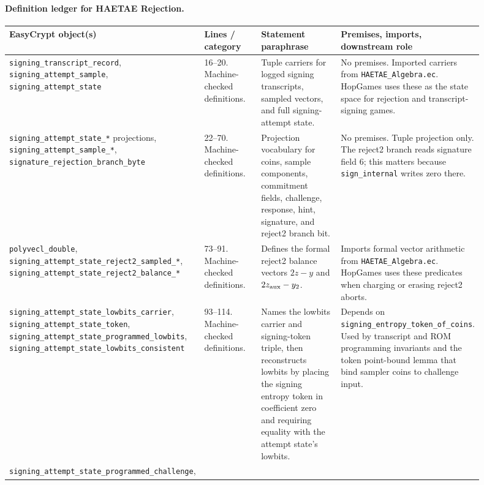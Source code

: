 \documentclass[11pt]{report}
\DeclareRobustCommand{\file}[1]{\ifmmode\text{\nolinkurl{#1}}\else\nolinkurl{#1}\fi}
\DeclareRobustCommand{\ec}[1]{\ifmmode\text{\nolinkurl{#1}}\else\nolinkurl{#1}\fi}
\theoremstyle{definition}
\theoremstyle{plain}
\begin{document}
\paragraph{Definition ledger for HAETAE Rejection.}
{\footnotesize
\begin{longtable}{p{0.24\linewidth}p{0.15\linewidth}p{0.27\linewidth}p{0.24\linewidth}}
\toprule
\textbf{EasyCrypt object(s)} & \textbf{Lines / category} &
\textbf{Statement paraphrase} & \textbf{Premises, imports, downstream role} \\
\midrule
\ec{signing\_transcript\_record}, \ec{signing\_attempt\_sample},
\ec{signing\_attempt\_state} &
16--20. Machine-checked definitions. &
Tuple carriers for logged signing transcripts, sampled vectors, and full
signing-attempt state. &
No premises.  Imported carriers from \file{HAETAE\_Algebra.ec}.  HopGames uses
these as the state space for rejection and transcript-signing games. \\
\midrule
\ec{signing\_attempt\_state\_*} projections,
\ec{signing\_attempt\_sample\_*},
\ec{signature\_rejection\_branch\_byte} &
22--70. Machine-checked definitions. &
Projection vocabulary for coins, sample components, commitment fields,
challenge, response, hint, signature, and reject2 branch bit. &
No premises.  Tuple projection only.  The reject2 branch reads signature field
6; this matters because \ec{sign\_internal} writes zero there. \\
\midrule
\ec{polyvecl\_double},
\ec{signing\_attempt\_state\_reject2\_sampled\_*},
\ec{signing\_attempt\_state\_reject2\_balance\_*} &
73--91. Machine-checked definitions. &
Defines the formal reject2 balance vectors \(2z-y\) and \(2z_{\rm aux}-y_2\). &
Imports formal vector arithmetic from \file{HAETAE\_Algebra.ec}.  HopGames
uses these predicates when charging or erasing reject2 aborts. \\
\midrule
\ec{signing\_attempt\_state\_lowbits\_carrier},
\ec{signing\_attempt\_state\_token},
\ec{signing\_attempt\_state\_programmed\_lowbits},
\ec{signing\_attempt\_state\_lowbits\_consistent} &
93--114. Machine-checked definitions. &
Names the lowbits carrier and signing-token triple, then reconstructs lowbits
by placing the signing entropy token in coefficient zero and requiring equality
with the attempt state's lowbits. &
Depends on \ec{signing\_entropy\_token\_of\_coins}.  Used by transcript and ROM
programming invariants and the token point-bound lemma that bind sampler coins
to challenge input. \\
\midrule
\ec{signing\_attempt\_state\_programmed\_challenge},

\end{longtable}}
\end{document}
